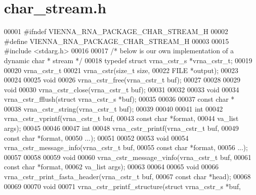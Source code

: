 \hypertarget{char__stream_8h_source}{}\section{char\+\_\+stream.\+h}
\label{char__stream_8h_source}

\begin{DoxyCode}
00001 \textcolor{preprocessor}{#ifndef VIENNA\_RNA\_PACKAGE\_CHAR\_STREAM\_H}
00002 \textcolor{preprocessor}{#define VIENNA\_RNA\_PACKAGE\_CHAR\_STREAM\_H}
00003 
00015 \textcolor{preprocessor}{#include <stdarg.h>}
00016 
00017 \textcolor{comment}{/* below is our own implementation of a dynamic char * stream */}
00018 \textcolor{keyword}{typedef} \textcolor{keyword}{struct }vrna\_cstr\_s *vrna\_cstr\_t;
00019 
00020 vrna\_cstr\_t
00021 vrna\_cstr(\textcolor{keywordtype}{size\_t}  size,
00022           FILE    *output);
00023 
00024 
00025 \textcolor{keywordtype}{void}
00026 vrna\_cstr\_free(vrna\_cstr\_t buf);
00027 
00028 
00029 \textcolor{keywordtype}{void}
00030 vrna\_cstr\_close(vrna\_cstr\_t buf);
00031 
00032 
00033 \textcolor{keywordtype}{void}
00034 vrna\_cstr\_fflush(\textcolor{keyword}{struct} vrna\_cstr\_s *buf);
00035 
00036 
00037 \textcolor{keyword}{const} \textcolor{keywordtype}{char} *
00038 vrna\_cstr\_string(vrna\_cstr\_t buf);
00039 
00040 
00041 \textcolor{keywordtype}{int}
00042 vrna\_cstr\_vprintf(vrna\_cstr\_t buf,
00043                   \textcolor{keyword}{const} \textcolor{keywordtype}{char}  *format,
00044                   va\_list     args);
00045 
00046 
00047 \textcolor{keywordtype}{int}
00048 vrna\_cstr\_printf(vrna\_cstr\_t  buf,
00049                  \textcolor{keyword}{const} \textcolor{keywordtype}{char}   *format,
00050                  ...);
00051 
00052 
00053 \textcolor{keywordtype}{void}
00054 vrna\_cstr\_message\_info(vrna\_cstr\_t  buf,
00055                        \textcolor{keyword}{const} \textcolor{keywordtype}{char}   *format,
00056                        ...);
00057 
00058 
00059 \textcolor{keywordtype}{void}
00060 vrna\_cstr\_message\_vinfo(vrna\_cstr\_t buf,
00061                         \textcolor{keyword}{const} \textcolor{keywordtype}{char}  *format,
00062                         va\_list     args);
00063 
00064 
00065 \textcolor{keywordtype}{void}
00066 vrna\_cstr\_print\_fasta\_header(vrna\_cstr\_t  buf,
00067                              \textcolor{keyword}{const} \textcolor{keywordtype}{char}   *head);
00068 
00069 
00070 \textcolor{keywordtype}{void}
00071 vrna\_cstr\_printf\_structure(\textcolor{keyword}{struct} vrna\_cstr\_s *buf,

\end{DoxyCode}
